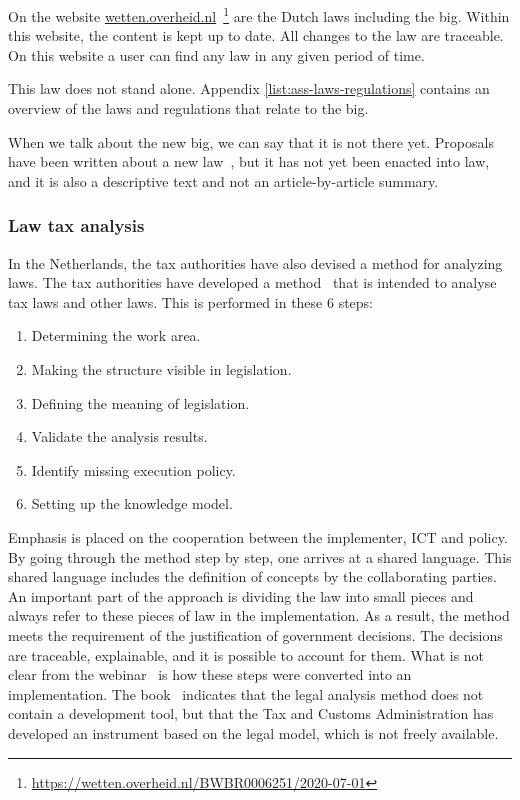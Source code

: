 On the  website  {\url{wetten.overheid.nl}}~\footnote{\url{https://wetten.overheid.nl/BWBR0006251/2020-07-01}} are the Dutch laws including the \acrshort{big}.
Within this website, the content is kept up to date.
All changes to the law are traceable.
On this website a user can find any law in any given period of time.


This law does not stand alone.
Appendix \ref{list:ass-laws-regulations} contains an overview of the laws and regulations that relate to the \acrshort{big}.

When we talk about the new \acrshort{big}, we can say that it is not there yet.
Proposals have been written about a new law~, but it has not yet been enacted into law, and it is also a descriptive text and not an article-by-article summary.




\subsubsection{Law tax analysis} \label{law_analysis}
In the Netherlands, the tax authorities have also devised a method for analyzing laws.
The tax authorities have developed a method~ that is intended to analyse tax laws and other laws.
This is performed in these 6 steps:
\begin{enumerate}
    \item Determining the work area.
    \item Making the structure visible in legislation.
    \item Defining the meaning of legislation.
    \item Validate the analysis results.
    \item Identify missing execution policy.
    \item Setting up the knowledge model.
\end{enumerate}
Emphasis is placed on the cooperation between the implementer, ICT and policy.
By going through the method step by step, one arrives at a shared language.
This shared language includes the definition of concepts by the collaborating parties.
An important part of the approach is dividing the law into small pieces and always refer to these pieces of law in the implementation.
As a result, the method meets the requirement of the justification of government decisions.
The decisions are traceable, explainable, and it is possible to account for them.
What is not clear from the webinar~ is how these steps were converted into an implementation.
The book~ indicates that the legal analysis method does not contain a development tool, but that the Tax and Customs Administration has developed an instrument based on the legal model, which is not freely available.